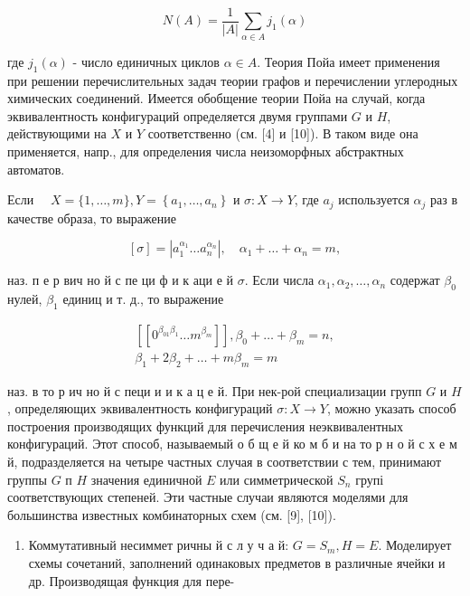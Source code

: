 \documentclass[10pt]{article}
\begin{document}
\[

N(A)=\frac{1}{|A|} \sum_{\alpha \in A} j_{1}(\alpha)

\]



где $j_{1}(\alpha)$ - число единичных циклов $\alpha \in A$. Теория Пойа имеет применения при решении перечислительных задач теории графов и перечислении углеродных химических соединений. Имеется обобщение теории Пойа на случай, когда эквивалентность конфигураций определяется двумя группами $G$ и $H$, действующими на $X$ и $Y$ соответственно (см. [4] и [10]). В таком виде она применяется, напр., для определения числа неизоморфных абстрактных автоматов.



Если $\quad X=\{1, \ldots, m\}, Y=\left\{a_{1}, \ldots, a_{n}\right\}$ и $\sigma: X \rightarrow Y$, где $a_{j}$ используется $\alpha_{j}$ раз в качестве образа, то выражение



\[

[\sigma]=\left|a_{1}^{\alpha_{1}} \ldots a_{n}^{\alpha_{n}}\right|, \quad \alpha_{1}+\ldots+\alpha_{n}=m,

\]



наз. п е р вич но й с пе ци ф и к аци е й $\sigma$. Если числа $\alpha_{1}, \alpha_{2}, \ldots, \alpha_{n}$ содержат $\beta_{0}$ нулей, $\beta_{1}$ единиц и т. д., то выражение



\[

\begin{gathered}

{\left[\left[0^{\beta_{01} \beta_{1}} \ldots m^{\beta_{m}}\right]\right], \beta_{0}+\ldots+\beta_{m}=n,} \\

\beta_{1}+2 \beta_{2}+\ldots+m \beta_{m}=m

\end{gathered}

\]



наз. в то р ич но й с пеци и и к а ц е й. При нек-рой специализации групп $G$ и $H$, определяющих эквивалентность конфигураций $\sigma: X \rightarrow Y$, можно указать способ построения производящих функций для перечисления неэквивалентных конфигураций. Этот способ, называемый о б щ е й ко м б и на то р н о й с х е м й, подразделяется на четыре частных случая в соответствии с тем, принимают группы $G$ п $H$ значения единичной $E$ или симметрической $S_{n}$ групі соответствующих степеней. Эти частные случаи являются моделями для большинства известных комбинаторных схем (см. [9], [10]).



\begin{enumerate}

  \item Коммутативный несиммет ричны й с л у ч а й: $G=S_{m}, H=E$. Моделирует схемы сочетаний, заполнений одинаковых предметов в различные ячейки и др. Производящая функция для пере-

\end{enumerate}
\end{document}
